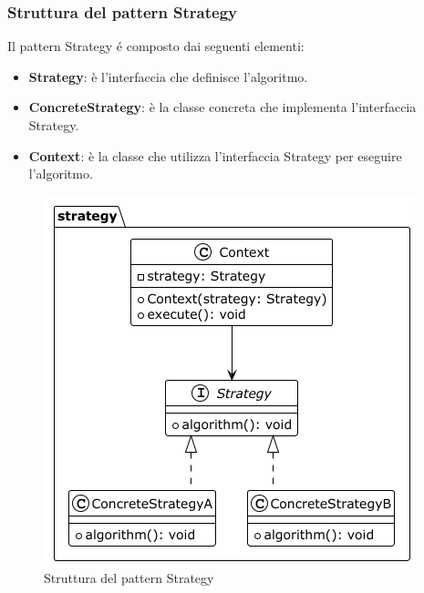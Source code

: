 \documentclass[11pt]{article}
\begin{document}
\subsubsection{Struttura del pattern Strategy}
Il pattern Strategy é composto dai seguenti elementi:
\begin{itemize}
    \item \textbf{Strategy}: è l'interfaccia che definisce l'algoritmo.
    \item \textbf{ConcreteStrategy}: è la classe concreta che implementa l'interfaccia Strategy.
    \item \textbf{Context}: è la classe che utilizza l'interfaccia Strategy per eseguire l'algoritmo.
    \end{itemize}
\begin{figure}[h]
    \centering
    \includegraphics[scale=0.5]{strategyUML}
    \caption{Struttura del pattern Strategy}
    \label{fig:strategyUML}
\end{figure}
\end{document}

